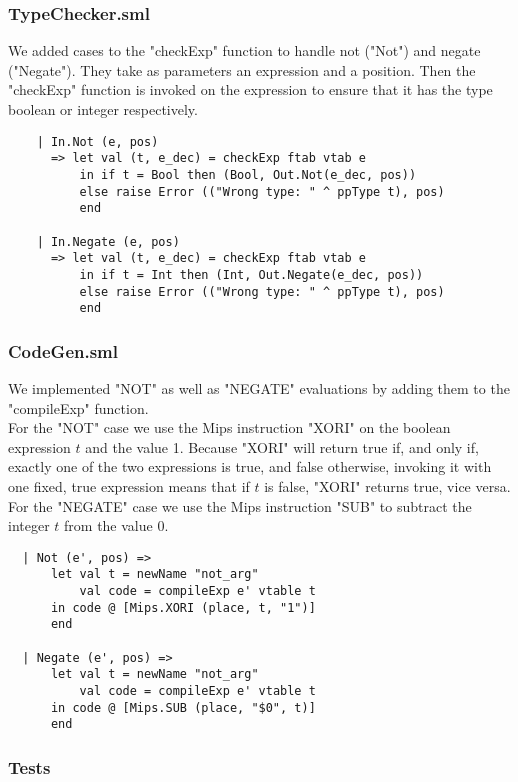 \documentclass[12pt]{article}
\begin{document}
\subsubsection{TypeChecker.sml}
We added cases to the "checkExp" function to handle not ("Not") and negate ("Negate"). They take as parameters an expression and a position. Then the "checkExp" function is invoked on the expression to ensure that it has the type boolean or integer respectively.
\begin{verbatim}
    | In.Not (e, pos)
      => let val (t, e_dec) = checkExp ftab vtab e
          in if t = Bool then (Bool, Out.Not(e_dec, pos))
          else raise Error (("Wrong type: " ^ ppType t), pos) 
          end

    | In.Negate (e, pos)
      => let val (t, e_dec) = checkExp ftab vtab e
          in if t = Int then (Int, Out.Negate(e_dec, pos))
          else raise Error (("Wrong type: " ^ ppType t), pos) 
          end
\end{verbatim}
\subsubsection{CodeGen.sml}
We implemented "NOT" as well as "NEGATE" evaluations by adding them to the "compileExp" function. \\

For the "NOT" case we use the Mips instruction "XORI" on the boolean expression \(t\) and the value 1. Because "XORI" will return true if, and only if, exactly one of the two expressions is true, and false otherwise, invoking it with one fixed, true expression means that if \(t\) is false, "XORI" returns true, vice versa. \\

For the "NEGATE" case we use the Mips instruction "SUB" to subtract the integer \(t\) from the value 0. 
\begin{verbatim}
  | Not (e', pos) =>
      let val t = newName "not_arg"
          val code = compileExp e' vtable t
      in code @ [Mips.XORI (place, t, "1")]
      end
      
  | Negate (e', pos) =>
      let val t = newName "not_arg"
          val code = compileExp e' vtable t
      in code @ [Mips.SUB (place, "$0", t)]
      end
\end{verbatim}
\subsubsection{Tests}
\end{document}
